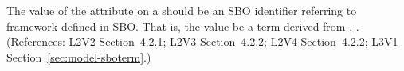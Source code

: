 The value of the  attribute on a \Model should be
an SBO identifier referring to  framework defined
in SBO.  That is, the value  be a term derived from
\changed{\sbointeractionID}, .  (References: L2V2
Section~4.2.1; L2V3 Section~4.2.2; L2V4 Section~4.2.2; L3V1 Section~\ref{sec:model-sboterm}.)
